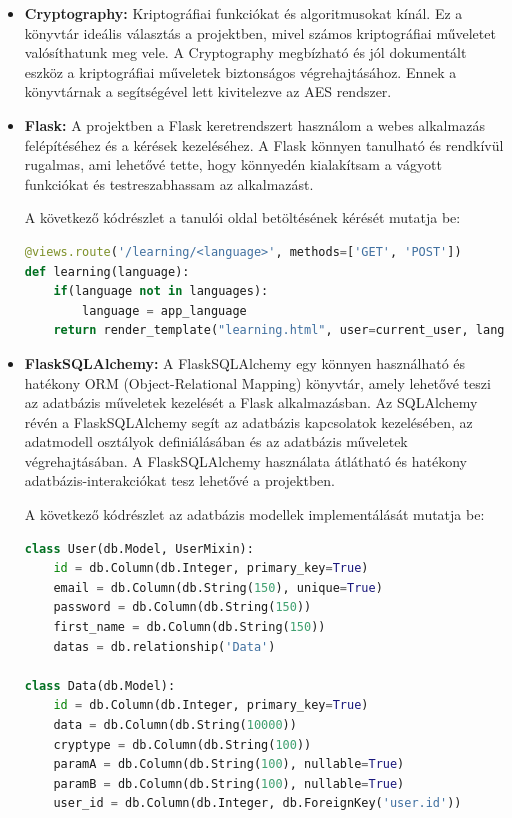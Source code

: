\begin{itemize}
  	\item\textbf{Cryptography:}
Kriptográfiai funkciókat és algoritmusokat kínál. Ez a könyvtár ideális választás a projektben, mivel számos kriptográfiai műveletet valósíthatunk meg vele. A Cryptography megbízható és jól dokumentált eszköz a kriptográfiai műveletek biztonságos végrehajtásához. Ennek a könyvtárnak a segítségével lett kivitelezve az AES rendszer.

 	 \item\textbf{Flask:}
A projektben a Flask keretrendszert használom a webes alkalmazás felépítéséhez és a kérések kezeléséhez. A Flask könnyen tanulható és rendkívül rugalmas, ami lehetővé tette, hogy könnyedén kialakítsam a vágyott funkciókat és testreszabhassam az alkalmazást.

A következő kódrészlet a tanulói oldal betöltésének kérését mutatja be:
\begin{lstlisting}[caption={Learning oldal renderelése}, captionpos=b, language = Python]
@views.route('/learning/<language>', methods=['GET', 'POST'])
def learning(language):
    if(language not in languages):
        language = app_language
    return render_template("learning.html", user=current_user, language=language, **languages[language])
\end{lstlisting}

 	 \item\textbf{FlaskSQLAlchemy:}
A FlaskSQLAlchemy egy könnyen használható és hatékony ORM (Object-Relational Mapping) könyvtár, amely lehetővé teszi az adatbázis műveletek kezelését a Flask alkalmazásban. Az SQLAlchemy révén a FlaskSQLAlchemy segít az adatbázis kapcsolatok kezelésében, az adatmodell osztályok definiálásában és az adatbázis műveletek végrehajtásában. A FlaskSQLAlchemy használata átlátható és hatékony adatbázis-interakciókat tesz lehetővé a projektben.

A következő kódrészlet az adatbázis modellek implementálását mutatja be:
\begin{lstlisting}[caption={Adatbázis modellek}, captionpos=b, language = Python]
class User(db.Model, UserMixin):
    id = db.Column(db.Integer, primary_key=True)
    email = db.Column(db.String(150), unique=True)
    password = db.Column(db.String(150))
    first_name = db.Column(db.String(150))
    datas = db.relationship('Data')

class Data(db.Model):
    id = db.Column(db.Integer, primary_key=True)
    data = db.Column(db.String(10000))
    cryptype = db.Column(db.String(100))
    paramA = db.Column(db.String(100), nullable=True)
    paramB = db.Column(db.String(100), nullable=True)
    user_id = db.Column(db.Integer, db.ForeignKey('user.id'))
\end{lstlisting}


\end{itemize}
